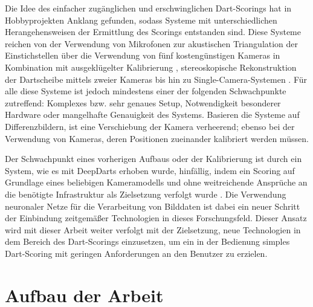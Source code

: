 Die Idee des einfacher zugänglichen und erschwinglichen Dart-Scorings hat in Hobbyprojekten Anklang gefunden, sodass Systeme mit unterschiedlichen Herangehensweisen der Ermittlung des Scorings entstanden sind. Diese Systeme reichen von der Verwendung von Mikrofonen zur akustischen Triangulation der Einstichstellen \cite{dart_scoring_microphone} über die Verwendung von fünf kostengünstigen Kameras in Kombination mit ausgeklügelter Kalibrierung \cite{dart_scoring_multicam}, stereoskopische Rekonstruktion der Dartscheibe mittels zweier Kameras \cite{darts_project_3,darts_project_4} bis hin zu Single-Camera-Systemen \cite{darts_project_1,darts_project_2}. Für alle diese Systeme ist jedoch mindestens einer der folgenden Schwachpunkte zutreffend: Komplexes bzw. sehr genaues Setup, Notwendigkeit besonderer Hardware oder mangelhafte Genauigkeit des Systems. Basieren die Systeme auf Differenzbildern, ist eine Verschiebung der Kamera verheerend; ebenso bei der Verwendung von Kameras, deren Positionen zueinander kalibriert werden müssen.

Der Schwachpunkt eines vorherigen Aufbaus oder der Kalibrierung ist durch ein System, wie es mit DeepDarts erhoben wurde, hinfällig, indem ein Scoring auf Grundlage eines beliebigen Kameramodells und ohne weitreichende Ansprüche an die benötigte Infrastruktur als Zielsetzung verfolgt wurde \cite{deepdarts}. Die Verwendung neuronaler Netze für die Verarbeitung von Bilddaten ist dabei ein neuer Schritt der Einbindung zeitgemäßer Technologien in dieses Forschungsfeld. Dieser Ansatz wird mit dieser Arbeit weiter verfolgt mit der Zielsetzung, neue Technologien in dem Bereich des Dart-Scorings einzusetzen, um ein in der Bedienung simples Dart-Scoring mit geringen Anforderungen an den Benutzer zu erzielen.



\section{Aufbau der Arbeit}
\label{sec:aufbau}

